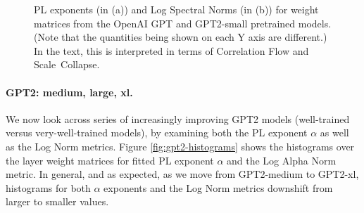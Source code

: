 \begin{figure}[htb]
    \centering
    \quad
    \caption{PL exponents 
             (in (a)) and Log Spectral Norms 
             (in (b)) for weight matrices from the OpenAI GPT and GPT2-small pretrained models.  (Note that the quantities being shown on each Y axis are different.)
             In the text, this is interpreted in terms of Correlation Flow and Scale~Collapse.
            }
    \label{fig:gpt-alpha-layers}
\end{figure}


\paragraph{GPT2: medium, large, xl.} 

We now look across series of increasingly improving GPT2 models (well-trained versus very-well-trained models), by examining both the PL exponent $\alpha$ as well as the Log Norm metrics.  
Figure \ref{fig:gpt2-histograms} shows the histograms over the layer weight matrices for fitted PL exponent $\alpha$ and the Log Alpha Norm metric. 
In general, and as expected, as we move from GPT2-medium to GPT2-xl, histograms for both $\alpha$ exponents and the Log Norm metrics downshift from larger to smaller values. 

